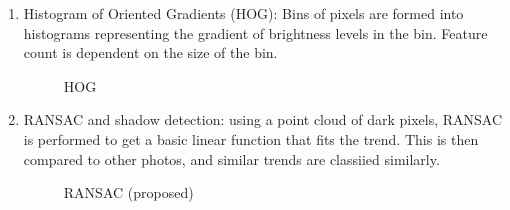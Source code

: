 \documentclass{article}
\begin{document}
\begin{enumerate}[1.]
\item Histogram of Oriented Gradients (HOG): Bins of pixels are formed into histograms representing the gradient of brightness levels in the bin. Feature count is dependent on the size of the bin. 
\begin{figure}[H]
\centering
\setlength\fboxsep{2pt}
\setlength\fboxrule{0pt}
\caption{
HOG
}
\end{figure}

\item RANSAC and shadow detection: using a point cloud of dark pixels, RANSAC is performed to get a basic linear function that fits the trend. This is then compared to other photos, and similar trends are classiied similarly.
\begin{figure}[H]
\centering
\setlength\fboxsep{2pt}
\setlength\fboxrule{0pt}
\caption{
RANSAC (proposed)
}
\end{figure}

\end{enumerate}



\end{document}
